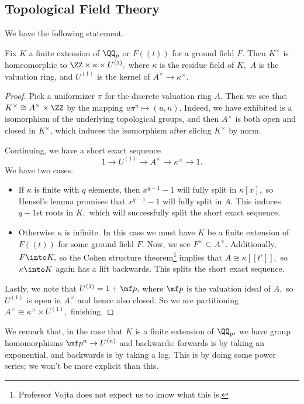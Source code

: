 \documentclass[../notes.tex]{subfiles}
\begin{document}
\subsection{Topological Field Theory}
We have the following statement.
\begin{proposition}
	Fix $K$ a finite extension of $\QQ_p$ or $F((t))$ for a ground field $F.$ Then $K^\times$ is homeomorphic to $\ZZ\times\kappa\times U^{(1)},$ where $\kappa$ is the residue field of $K,$ $A$ is the valuation ring, and $U^{(1)}$ is the kernel of $A^\times\to\kappa^\times.$
\end{proposition}
\begin{proof}
	Pick a uniformizer $\pi$ for the discrete valuation ring $A.$ Then we see that $K^\times\cong A^\times\times\ZZ$ by the mapping $u\pi^n\mapsto(u,n).$ Indeed, we have exhibited is a isomorphism of the underlying topological groups, and then $A^\times$ is both open and closed in $K^\times$\todo{}, which induces the isomorphism after slicing $K^\times$ by norm.

	Continuing, we have a short exact sequence
	\[1\to U^{(1)}\to A^\times\to\kappa^\times\to1.\]
	We have two cases.
	\begin{itemize}
		\item If $\kappa$ is finite with $q$ elements, then $x^{q-1}-1$ will fully split in $\kappa[x],$ so Hensel's lemma promises that $x^{q-1}-1$ will fully split in $A.$ This induces $q-1$st roots in $K,$ which will successfully split the short exact sequence.
		\item Otherwise $\kappa$ is infinite. In this case we must have $K$ be a finite extension of $F((t))$ for some ground field $F.$ Now, we see $F^\times\subseteq A^\times.$ Additionally, $F\into K,$ so the Cohen structure theorem\footnote{Professor Vojta does not expect us to know what this is.} implies that $A\cong\kappa[[t']],$ so $\kappa\into K$ again has a lift backwards. This splits the short exact sequence.
	\end{itemize}
	Lastly, we note that $U^{(1)}=1+\mf p,$ where $\mf p$ is the valuation ideal of $A,$ so $U^{(1)}$ is open in $A^\times$ and hence also closed. So we are partitioning $A^\times\cong\kappa^\times\times U^{(1)},$ finishing.
\end{proof}
We remark that, in the case that $K$ is a finite extension of $\QQ_p,$ we have group homomorphisms $\mf p^n\to U^{(n)}$ and backwards: forwards is by taking an exponential, and backwards is by taking a log. This is by doing some power series; we won't be more explicit than this.
\end{document}
